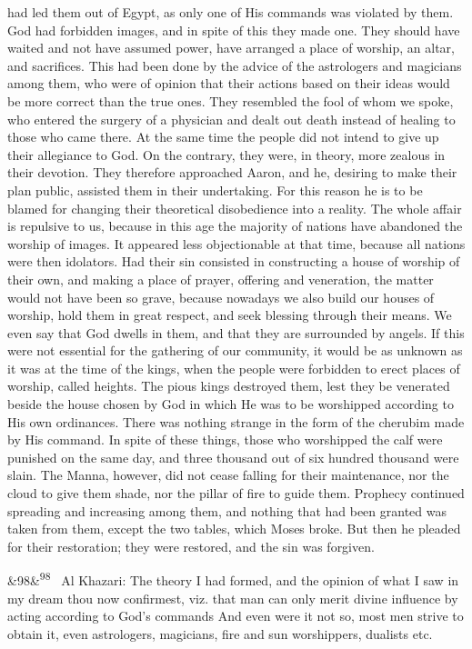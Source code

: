 \documentclass[12pt]{article}
\newcommand{\para}[1][]{\par\noindent\ifx&#1&\else\textsuperscript{\footnotesize #1}~\fi}
\begin{document}
had led them out of Egypt, as only one of His commands was violated by them. God had forbidden images, and in spite of this they made one. They should have waited and not have assumed power, have arranged a place of worship, an altar, and sacrifices. This had been done by the advice of the astrologers and magicians among them, who were of opinion that their actions based on their ideas would be more correct than the true ones. They resembled the fool of whom we spoke, who entered the surgery of a physician and dealt out death instead of healing to those who came there. At the same time the people did not intend to give up their allegiance to God. On the contrary, they were, in theory, more zealous in their devotion. They therefore approached Aaron, and he, desiring to make their plan public, assisted them in their undertaking. For this reason he is to be blamed for changing their theoretical disobedience into a reality. The whole affair is repulsive to us, because in this age the majority of nations have abandoned the worship of images. It appeared less objectionable at that time, because all nations were then idolators. Had their sin consisted in constructing a house of worship of their own, and making a place of prayer, offering and veneration, the matter would not have been so grave, because nowadays we also build our houses of worship, hold them in great respect, and seek blessing through their means. We even say that God dwells in them, and that they are surrounded by angels. If this were not essential for the gathering of our community, it would be as unknown as it was at the time of the kings, when the people were forbidden to erect places of worship, called heights. The pious kings destroyed them, lest they be venerated beside the house chosen by God in which He was to be worshipped according to His own ordinances. There was nothing strange in the form of the cherubim made by His command. In spite of these things, those who worshipped the calf were punished on the same day, and three thousand out of six hundred thousand were slain. The Manna, however, did not cease falling for their maintenance, nor the cloud to give them shade, nor the pillar of fire to guide them. Prophecy continued spreading and increasing among them, and nothing that had been granted was taken from them, except the two tables, which Moses broke. But then he pleaded for their restoration; they were restored, and the sin was forgiven.

\para[98] Al Khazari: The theory I had formed, and the opinion of what I saw in my dream thou now confirmest, viz. that man can only merit divine influence by acting according to God's commands And even were it not so, most men strive to obtain it, even astrologers, magicians, fire and sun worshippers, dualists etc.
\end{document}
